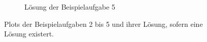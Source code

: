 \begin{figure}
\begin{subfigure}[b]{0.49\textwidth}
         \caption{Lösung der Beispielaufgabe 5}
         \label{fig:five over x}
     \end{subfigure}
        \caption{Plots der Beispielaufgaben 2 bis 5 und ihrer Lösung, sofern eine Lösung existert.}
        \label{fig:three graphs}
\end{figure}

